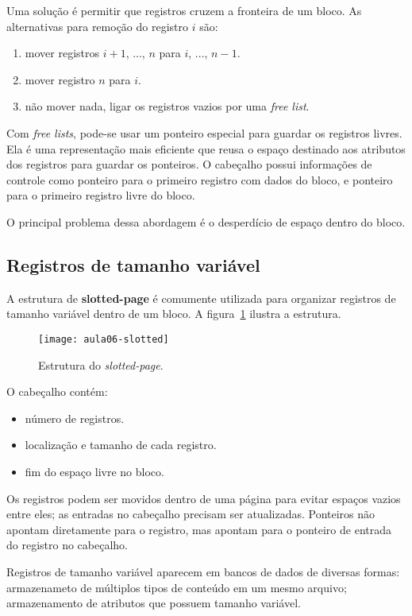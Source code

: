 Uma solução é permitir que registros cruzem a fronteira de um bloco. 
As alternativas para remoção do registro $i$ são:
\begin{enumerate}
\item mover registros $i+1$, ..., $n$ para $i$, ..., $n-1$.
\item mover registro $n$ para $i$.
\item não mover nada, ligar os registros vazios por uma \emph{free list}.
\end{enumerate}

Com \emph{free lists}, pode-se usar um ponteiro especial para guardar os registros livres.
Ela é uma representação mais eficiente que reusa o espaço destinado
aos atributos dos registros para guardar os ponteiros.
O cabeçalho possui informações de controle como ponteiro para o primeiro registro
com dados do bloco, e ponteiro para o primeiro registro livre do bloco.

O principal problema dessa abordagem é o desperdício de espaço dentro do bloco.

\subsection{Registros de tamanho variável}

A estrutura de \textbf{slotted-page} é comumente utilizada para organizar
registros de tamanho variável dentro de um bloco.
A figura~\ref{aula06:fig:slotted} ilustra a estrutura.
%
\begin{figure}[!htb]
\centering
\texttt{[image: aula06-slotted]}
\caption{Estrutura do \emph{slotted-page}.}
\label{aula06:fig:slotted}
\end{figure}
O cabeçalho contém:
\begin{itemize}
\item número de registros.
\item localização e tamanho de cada registro.
\item fim do espaço livre no bloco.
\end{itemize}
Os registros podem ser movidos dentro de uma página para evitar espaços vazios
entre eles; as entradas no cabeçalho precisam ser atualizadas.
Ponteiros não apontam diretamente para o registro, mas apontam 
para o ponteiro de entrada do registro no cabeçalho.

Registros de tamanho variável aparecem em bancos de dados de diversas formas:
armazenameto de múltiplos tipos de conteúdo em um mesmo arquivo;
armazenamento de atributos que possuem tamanho variável.

